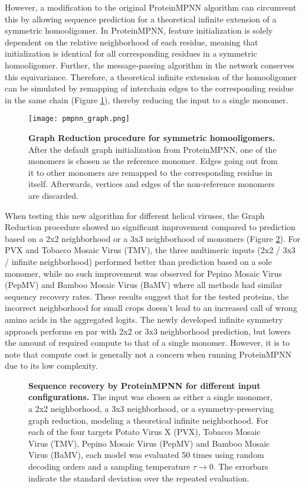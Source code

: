 However, a modification to the original ProteinMPNN algorithm can circumvent this by allowing sequence prediction for a theoretical infinite extension of a symmetric homooligomer. In ProteinMPNN, feature initialization is solely dependent on the relative neighborhood of each residue, meaning that initialization is identical for all corresponding residues in a symmetric homooligomer. Further, the message-passing algorithm in the network conserves this equivariance. Therefore, a theoretical infinite extension of the homooligomer can be simulated by remapping of interchain edges to the corresponding residue in the same chain (Figure \ref{fig:pmpnn_graph}), thereby reducing the input to a single monomer. 

\begin{figure}
\centering
\texttt{[image: pmpnn\_graph.png]}
\caption{\textbf{Graph Reduction procedure for symmetric homooligomers.} After the default graph initialization from ProteinMPNN, one of the monomers is chosen as the reference monomer. Edges going out from it to other monomers are remapped to the corresponding residue in itself. Afterwards, vertices and edges of the non-reference monomers are discarded. }
\label{fig:pmpnn_graph}
\end{figure}

When testing this new algorithm for different helical viruses, the Graph Reduction procedure showed no significant improvement compared to prediction based on a 2x2 neighborhood or a 3x3 neighborhood of monomers (Figure \ref{fig:pmpnn_comp}). For PVX and Tobacco Mosaic Virus (TMV), the three multimeric inputs (2x2 / 3x3 / infinite neighborhood) performed better than prediction based on a sole monomer, while no such improvement was observed for Pepino Mosaic Virus (PepMV) and Bamboo Mosaic Virus (BaMV) where all methods had similar sequency recovery rates. These results suggest that for the tested proteins, the incorrect neighborhood for small crops doesn't lead to an increased call of wrong amino acids in the aggregated logits. The newly developed infinite symmetry approach performs en par with 2x2 or 3x3 neighborhood prediction, but lowers the amount of required compute to that of a single monomer. However, it is to note that compute cost is generally not a concern when running ProteinMPNN due to its low complexity. 

\begin{figure}
\centering

\caption{\textbf{Sequence recovery by ProteinMPNN for different input configurations.} The input was chosen as either a single monomer, a 2x2 neighborhood, a 3x3 neighborhood, or a symmetry-preserving graph reduction, modeling a theoretical infinite neighborhood. For each of the four targets Potato Virus X (PVX), Tobacco Mosaic Virus (TMV), Pepino Mosaic Virus (PepMV) and Bamboo Mosaic Virus (BaMV), each model was evaluated 50 times using random decoding orders and a sampling temperature $\tau\rightarrow 0$. The errorbars indicate the standard deviation over the repeated evaluation. }
\label{fig:pmpnn_comp}
\end{figure}

